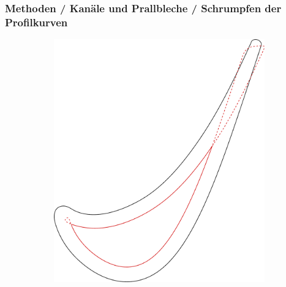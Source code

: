 \documentclass[8pt, aspectratio=169]{beamer}
\begin{document}
\begin{frame}
	\frametitle{Methoden / Kanäle und Prallbleche / Schrumpfen der Profilkurven}
	\vspace{-1cm}\hspace{-0.5cm}
	\begin{figure}
		\centering
		\begin{subfigure}[t]{.49\textwidth}
			\includegraphics[height=.8\textheight]{../tec/shrinking/offset.png}
		\end{subfigure}
		\begin{subfigure}[t]{.49\textwidth}

\end{subfigure}
\end{figure}
\end{frame}
\end{document}
